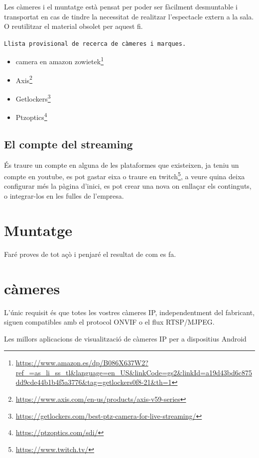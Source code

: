 \documentclass[
  10pt,
]{krantz}
\DeclareRobustCommand{\href}[2]{#2\footnote{\url{#1}}}
\begin{document}
Les càmeres i el muntatge està pensat per poder ser fàcilment desmuntable i transportat en cas de tindre la necessitat de realitzar l'espectacle extern a la sala. O reutilitzar el material obsolet per aquest fi.

\texttt{Llista\ provisional\ de\ recerca\ de\ càmeres\ i\ marques.}

\begin{itemize}
\item
  \href{https://www.amazon.es/dp/B086X637W2?ref_=as_li_ss_tl\&language=en_US\&linkCode=gs2\&linkId=a19d43bd6c875dd9cde44b1b4f5a3776\&tag=getlockers0f8-21\&th=1}{camera en amazon zowietek}
\item
  \href{https://www.axis.com/en-us/products/axis-v59-series}{Axis}
\item
  \href{https://getlockers.com/best-ptz-camera-for-live-streaming/}{Getlockers}
\item
  \href{https://ptzoptics.com/sdi/}{Ptzoptics}
\end{itemize}

\hypertarget{el-compte-del-streaming}{%
\subsection{El compte del streaming}\label{el-compte-del-streaming}}

És traure un compte en alguna de les plataformes que existeixen, ja teniu un compte en youtube, es pot gastar eixa o traure en \href{https://www.twitch.tv/}{twitch}, a veure quina deixa configurar més la pàgina d'inici, es pot crear una nova on enllaçar els continguts, o integrar-los en les fulles de l'empresa.

\hypertarget{muntatge}{%
\section{Muntatge}\label{muntatge}}

Faré proves de tot açò i penjaré el resultat de com es fa.

\hypertarget{cuxe0meres}{%
\section{càmeres}\label{cuxe0meres}}

L'únic requisit és que totes les vostres càmeres IP, independentment del fabricant, siguen compatibles amb el protocol ONVIF o el flux RTSP/MJPEG.

Les millors aplicacions de visualització de càmeres IP per a dispositius Android
\end{document}
